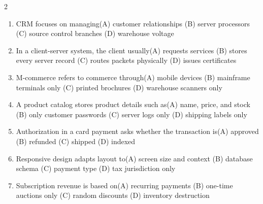 \documentclass[a4paper]{article}
\begin{document}
\begin{multicols*}{2}
\fontsize{8.5}{10}\selectfont
\begin{enumerate}[resume]
\item CRM focuses on managing\newline\hspace*{0.6em}(A) customer relationships \quad (B) server processors \newline\hspace*{0.6em}(C) source control branches \quad (D) warehouse voltage
\item In a client-server system, the client usually\newline\hspace*{0.6em}(A) requests services \quad (B) stores every server record \newline\hspace*{0.6em}(C) routes packets physically \quad (D) issues certificates
\item M-commerce refers to commerce through\newline\hspace*{0.6em}(A) mobile devices \quad (B) mainframe terminals only \newline\hspace*{0.6em}(C) printed brochures \quad (D) warehouse scanners only
\item A product catalog stores product details such as\newline\hspace*{0.6em}(A) name, price, and stock \quad (B) only customer passwords \newline\hspace*{0.6em}(C) server logs only \quad (D) shipping labels only
\item Authorization in a card payment asks whether the transaction is\newline\hspace*{0.6em}(A) approved \quad (B) refunded \newline\hspace*{0.6em}(C) shipped \quad (D) indexed
\item Responsive design adapts layout to\newline\hspace*{0.6em}(A) screen size and context \quad (B) database schema \newline\hspace*{0.6em}(C) payment type \quad (D) tax jurisdiction only
\item Subscription revenue is based on\newline\hspace*{0.6em}(A) recurring payments \quad (B) one-time auctions only \newline\hspace*{0.6em}(C) random discounts \quad (D) inventory destruction

\end{enumerate}
\end{multicols*}
\end{document}

